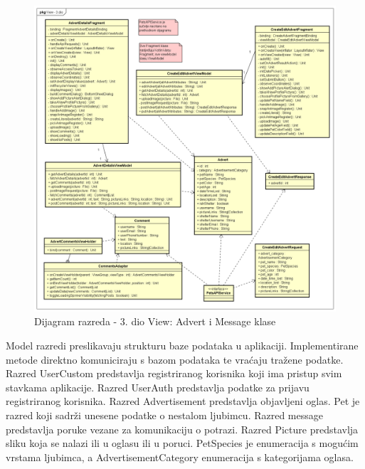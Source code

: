 			\begin{figure}[H]
				\includegraphics[scale=0.45]{dijagrami/dijagramiRazreda/View3.PNG} %
				\centering
				\caption{Dijagram razreda - 3. dio View: Advert i Message klase}
				\label{fig:drView3}
			\end{figure}

			Model razredi preslikavaju strukturu baze podataka u aplikaciji. Implementirane metode direktno komuniciraju s bazom podataka te vraćaju tražene podatke. Razred UserCustom predstavlja registriranog korisnika koji ima pristup svim stavkama aplikacije. Razred UserAuth predstavlja podatke za prijavu registriranog korisnika. Razred Advertisement predstavlja objavljeni oglas. Pet je razred koji sadrži unesene podatke o nestalom ljubimcu. Razred message predstavlja poruke vezane za komunikaciju o potrazi. Razred Picture predstavlja sliku koja se nalazi ili u oglasu ili u poruci. PetSpecies je enumeracija s mogućim vrstama ljubimca, a AdvertisementCategory enumeracija s kategorijama oglasa.

